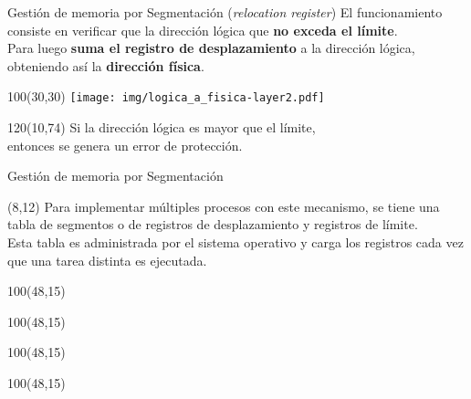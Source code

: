 \documentclass[aspectratio=169]{beamer}
\begin{document}
\begin{frame}[t]{Gestión de memoria por Segmentación (\emph{relocation register})}
    El funcionamiento consiste en verificar que la dirección lógica que \textbf{no exceda el límite}.\\
    \medskip
    Para luego \textbf{suma el registro de desplazamiento} a la dirección lógica,\\
    \medskip
    obteniendo así la \textbf{dirección física}.\\
    \begin{textblock}{100}(30,30)
    \texttt{[image: img/logica\_a\_fisica-layer2.pdf]}
    \end{textblock}
    \begin{textblock}{120}(10,74)
    Si la dirección lógica es mayor que el límite,\\ entonces se genera un error de protección.
    \end{textblock}
\end{frame}

\begin{frame}[t]{Gestión de memoria por Segmentación}
    \begin{textblock}{50}(8,12)
    Para implementar múltiples procesos con este mecanismo, se tiene una tabla de segmentos o de registros de desplazamiento y registros de límite.\\
    \medskip
    \textcolor{verdeuca}{Esta tabla es administrada por el sistema operativo y carga los registros cada vez que una tarea distinta es ejecutada.}\\
    \medskip
    \end{textblock}
    \begin{textblock}{100}(48,15)  \end{textblock} %
    \begin{textblock}{100}(48,15)  \end{textblock} %
    \begin{textblock}{100}(48,15)  \end{textblock} %
    \begin{textblock}{100}(48,15)  \end{textblock} %
\end{frame}
\end{document}
